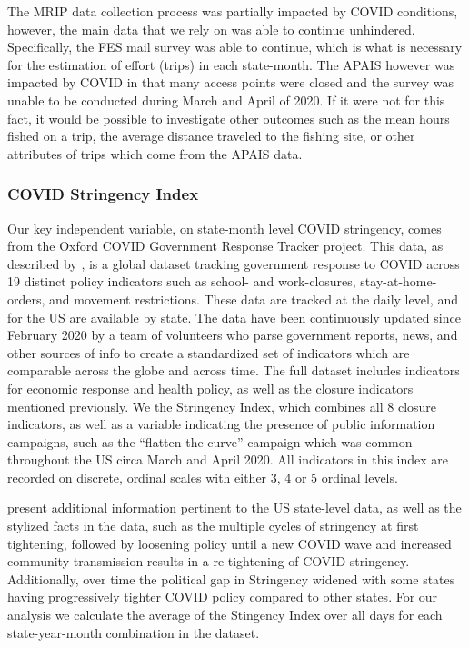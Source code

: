 \documentclass[12pt]{article}
\begin{document}
The MRIP data collection process was partially impacted by COVID
conditions, however, the main data that we rely on was able to continue
unhindered. Specifically, the FES mail survey was able to continue,
which is what is necessary for the estimation of effort (trips) in each
state-month. The APAIS however was impacted by COVID in that many access
points were closed and the survey was unable to be conducted during
March and April of 2020. If it were not for this fact, it would be
possible to investigate other outcomes such as the mean hours fished on
a trip, the average distance traveled to the fishing site, or other
attributes of trips which come from the APAIS data.

\subsubsection{COVID Stringency Index}

Our key independent variable, on state-month level COVID stringency,
comes from the Oxford COVID Government Response Tracker project. This
data, as described by \citet{hale2021global}, is a global dataset tracking
government response to COVID across 19 distinct policy indicators such
as school- and work-closures, stay-at-home-orders, and movement
restrictions. These data are tracked at the daily level, and for the US
are available by state. The data have been continuously updated since
February 2020 by a team of volunteers who parse government reports,
news, and other sources of info to create a standardized set of
indicators which are comparable across the globe and across time. The
full dataset includes indicators for economic response and health
policy, as well as the closure indicators mentioned previously. We the Stringency Index, which combines all 8 closure
indicators, as well as a variable indicating the presence of public
information campaigns, such as the ``flatten the curve'' campaign which
was common throughout the US circa March and April 2020. All indicators
in this index are recorded on discrete, ordinal scales with either 3, 4
or 5 ordinal levels.

\citet{hallas2021Variation} present additional information pertinent to the US
state-level data, as well as the stylized facts in the data, such as the
multiple cycles of stringency at first tightening, followed by loosening
policy until a new COVID wave and increased community transmission
results in a re-tightening of COVID stringency. Additionally, over time
the political gap in Stringency widened with some states
having progressively tighter COVID policy compared to other
states. For our analysis we calculate the average of the Stingency Index over all days
for each state-year-month combination in the dataset.
\end{document}

